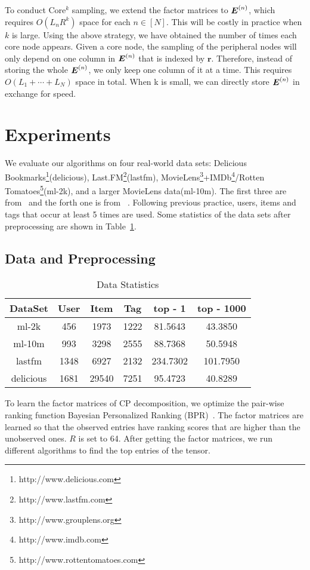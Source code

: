 \documentclass[10pt,journal,compsoc]{IEEEtran}
\newcommand{\M}[1]{{\boldsymbol{{\MakeUppercase{#1}}}}}
\newcommand{\FacMat}[2]{\M{#1}^{(#2)}}
\newcommand{\Table}[1]{Table~\ref{table:#1}}
\begin{document}
To conduct Core$^k$ sampling,
we extend the factor matrices to $\FacMat{E}{n}$,
which requires $O(L_nR^k)$ space for each $n\in[N]$.
This will be costly in practice when $k$ is large.
Using the above strategy, we have obtained the number of times each core node appears.
Given a core node, the sampling of the peripheral nodes
will only depend on one column in $\FacMat{E}{n}$ that is indexed by $\boldsymbol{r}$.
Therefore, instead of storing the whole $\FacMat{E}{n}$,
we only keep one column of it at a time.
This requires $O(L_1+\cdots+L_N)$ space in total.
When k is small, we can directly store $\FacMat{E}{n}$ in exchange for speed.
\section{Experiments}
%
%
%
%
%
We evaluate our algorithms on four real-world data sets:
Delicious Bookmarks\footnote{http://www.delicious.com}(delicious),
Last.FM\footnote{http://www.lastfm.com}(lastfm),
MovieLens\footnote{http://www.grouplens.org}+IMDb\footnote{http://www.imdb.com}/Rotten Tomatoes\footnote{http://www.rottentomatoes.com}(ml-2k),
and a larger MovieLens data(ml-10m).
The first three are from~\cite{Cantador:RecSys2011} and the forth one is from ~\cite{Harper2015}.
Following previous practice, users, items and tags that occur at least 5 times are used.
Some statistics of the data sets after preprocessing are shown in \Table{Data}.


\subsection{Data and Preprocessing}

\begin{table}[!ht]
	\centering
	\begin{tabular}{|c|c|c|c|c|c|}
		\hline
		 DataSet  & User & Item  & Tag  &  top - 1   & top - 1000 \\ \hline
		  ml-2k   & 456  & 1973  & 1222 & 81.5643  &  43.3850   \\
		 ml-10m   & 993  & 3298  & 2555 & 88.7368  &  50.5948   \\
		 lastfm   & 1348 & 6927  & 2132 & 234.7302 &  101.7950  \\
		delicious & 1681 & 29540 & 7251 & 95.4723  &  40.8289   \\ \hline
	\end{tabular}
	\caption{Data Statistics}
	\label{table:Data}
\end{table}
To learn the factor matrices of CP decomposition,
we optimize the pair-wise
ranking function Bayesian Personalized Ranking (BPR)~\cite{Rendle_BPR,Rendle_RTF}.
The factor matrices are learned so that the observed entries have ranking scores that are higher than the unobserved ones. 
$R$ is set to 64. 
After getting the factor matrices, 
we run different algorithms to find the top entries of the tensor.
\end{document}
